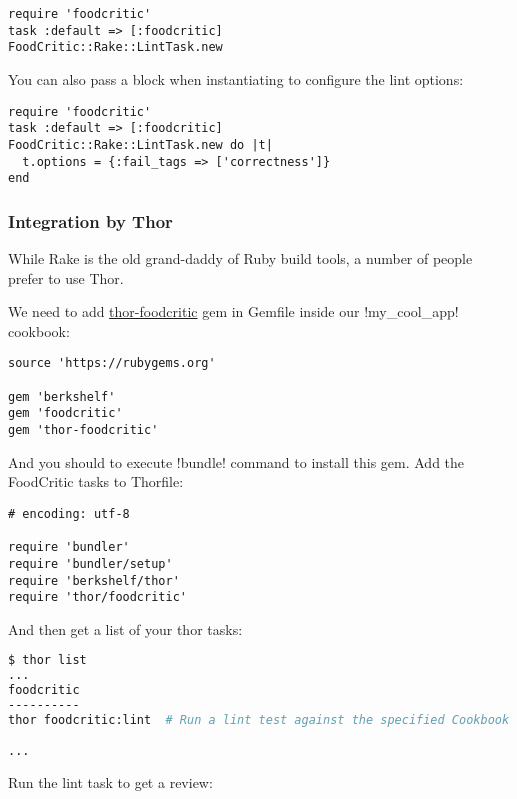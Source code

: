 \begin{lstlisting}[label=lst:testing-rake1]
require 'foodcritic'
task :default => [:foodcritic]
FoodCritic::Rake::LintTask.new
\end{lstlisting}

You can also pass a block when instantiating to configure the lint options:

\begin{lstlisting}[label=lst:testing-rake2]
require 'foodcritic'
task :default => [:foodcritic]
FoodCritic::Rake::LintTask.new do |t|
  t.options = {:fail_tags => ['correctness']}
end
\end{lstlisting}

\subsubsection{Integration by Thor}

While Rake is the old grand-daddy of Ruby build tools, a number of people prefer to use Thor.

We need to add \href{https://github.com/reset/thor-foodcritic}{thor-foodcritic} gem in Gemfile inside our \inline!my_cool_app! cookbook:

\begin{lstlisting}[label=lst:testing-thor1]
source 'https://rubygems.org'

gem 'berkshelf'
gem 'foodcritic'
gem 'thor-foodcritic'
\end{lstlisting}

And you should to execute \inline!bundle! command to install this gem. Add the FoodCritic tasks to Thorfile:

\begin{lstlisting}[label=lst:testing-thor2]
# encoding: utf-8

require 'bundler'
require 'bundler/setup'
require 'berkshelf/thor'
require 'thor/foodcritic'
\end{lstlisting}

And then get a list of your thor tasks:

\begin{lstlisting}[language=Bash,label=lst:testing-thor3]
$ thor list
...
foodcritic
----------
thor foodcritic:lint  # Run a lint test against the specified Cookbook and Role paths or otherwise your current working directory.

...
\end{lstlisting}

Run the lint task to get a review:

